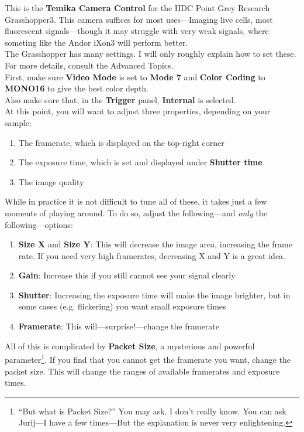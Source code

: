 \documentclass{article}
\begin{document}
This is the \textbf{Temika Camera Control} for the IIDC Point Grey Research Grasshopper3. This camera suffices for most uses---Imaging live cells, most fluorescent signals---though it may struggle with very weak signals, where someting like the Andor iXon3 will perform better.\\

The Grasshopper has many settings. I will only roughly explain how to set these. For more details, consult the Advanced Topics.\\

First, make sure \textbf{Video Mode} is set to \textbf{Mode 7} and \textbf{Color Coding} to \textbf{MONO16} to give the best color depth.\\

Also make sure that, in the \textbf{Trigger} panel, \textbf{Internal} is selected.\\

At this point, you will want to adjust three properties, depending on your sample:
\begin{enumerate}
	\item The framerate, which is displayed on the top-right corner
	\item The exposure time, which is set and displayed under \textbf{Shutter time}
	\item The image quality
\end{enumerate}

While in practice it is not difficult to tune all of these, it takes just a few moments of playing around. To do so, adjust the following---and \emph{only} the following---options:

\begin{enumerate}
	\item \textbf{Size X} and \textbf{Size Y}: This will decrease the image area, increasing the frame rate. If you need very high framerates, decreasing X and Y is a great idea.
	\item \textbf{Gain}: Increase this if you still cannot see your signal clearly
	\item \textbf{Shutter}: Increasing the exposure time will make the image brighter, but in some cases (e.g. flickering) you want small exposure times
	\item \textbf{Framerate}: This will---surprise!---change the framerate
\end{enumerate}

All of this is complicated by \textbf{Packet Size}, a mysterious and powerful parameter\footnote{``But what is Packet Size?'' You may ask. I don't really know. You can ask Jurij---I have a few times---But the explanation is never very enlightening.}. If you find that you cannot get the framerate you want, change the packet size. This will change the ranges of available framerates and exposure times.
\end{document}
